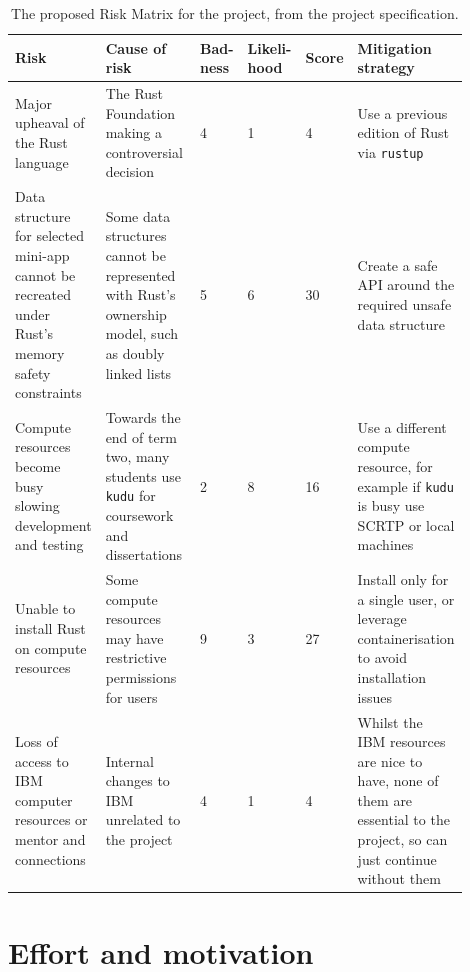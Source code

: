 \begin{table}[ht]
\begin{adjustwidth}{-3em}{-3em}
    \centering
    \caption{The proposed Risk Matrix for the project, from the project specification.}
    \label{tab:risk_matrix}
    \begin{tabular}{|p{0.2\linewidth}|p{0.25\linewidth}|p{0.065\linewidth}|p{0.085\linewidth}|p{0.055\linewidth}|p{0.24\linewidth}|} \hline
         Risk&  Cause of risk&  Bad- ness&  Likeli- hood&  Score& Mitigation strategy\\ \hline
         Major upheaval of the Rust language&  The Rust Foundation making a controversial decision \cite{AmNoLonger2023} \cite{AddRFCGovernance} \cite{TelemetryGoToolchain}&  4&  1&  \cellcolor{green!25}4 & Use a previous edition of Rust via \texttt{rustup}\\ \hline 
         Data structure for selected mini-app cannot be recreated under Rust's memory safety
  constraints&  Some data structures cannot be represented with Rust's ownership model, such as doubly linked lists \cite{leeBuildingMemorysafeNetwork2017}&  5&  6&  \cellcolor{red!25}30& Create a safe API around the required unsafe data structure\\ \hline 
         Compute resources become busy slowing development and testing&    Towards the end of term two, many students use \texttt{kudu} for coursework and dissertations&  2&  8&  \cellcolor{orange!25}16& Use a different compute resource, for example if \texttt{kudu} is busy use SCRTP or local machines\\ \hline 
         Unable to install Rust on compute resources&  Some compute resources may have restrictive permissions for users&  9&  3&  \cellcolor{red!25}27& Install only for a single user, or leverage containerisation to avoid installation issues\\ \hline 
 Loss of access to IBM computer resources or mentor and connections& Internal changes to IBM unrelated to the project& 4& 1& \cellcolor{green!25}4 &Whilst the IBM resources are nice to have, none of them are essential to the project, so can just continue without them\\ \hline
    \end{tabular}
    \end{adjustwidth}
\end{table}

\section{Effort and motivation}
\label{sec:effort-and-motivation}

